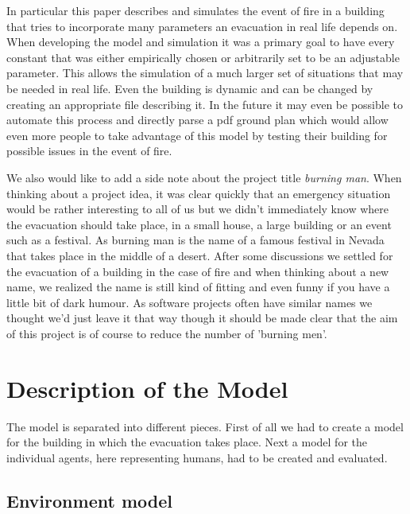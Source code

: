 \documentclass[11pt]{article}
\begin{document}
In particular this paper describes and simulates the event of fire in a building that tries to incorporate many parameters an evacuation in real life depends on. When developing the model and simulation it was a primary goal to have every constant that was either empirically chosen or arbitrarily set to be an adjustable parameter. This allows the simulation of a much larger set of situations that may be needed in real life. Even the building is dynamic and can be changed by creating an appropriate file describing it. In the future it may even be possible to automate this process and directly parse a pdf ground plan which would allow even more people to take advantage of this model by testing their building for possible issues in the event of fire.

We also would like to add a side note about the project title \textit{burning man}. When thinking about a project idea, it was clear quickly that an emergency situation would be rather interesting to all of us but we didn't immediately know where the evacuation should take place, in a small house, a large building or an event such as a festival. As burning man is the name of a famous festival in Nevada that takes place in the middle of a desert. After some discussions we settled for the evacuation of a building in the case of fire and when thinking about a new name, we realized the name is still kind of fitting and even funny if you have a little bit of dark humour. As software projects often have similar names we thought we'd just leave it that way though it should be made clear that the aim of this project is of course to reduce the number of 'burning men'.


\section{Description of the Model}

The model is separated into different pieces. First of all we had to create a model for the building in which the evacuation takes place. Next a model for the individual agents, here representing humans, had to be created and evaluated.

\subsection{Environment model}
\end{document}
